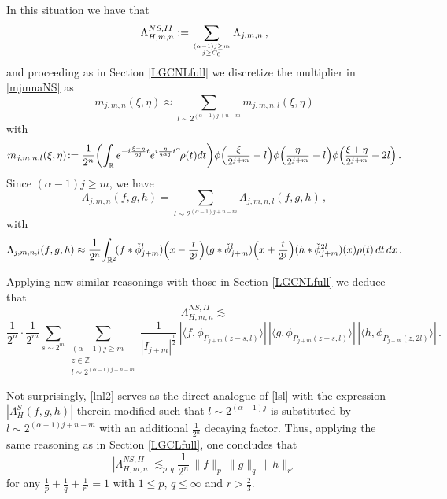 \documentclass[a4paper,reqno]{amsart}
\numberwithin{equation}{section}
\theoremstyle{definition}
\newcommand{\R}{\mathbb{R}}
\newcommand{\Z}{\mathbb{Z}}
\newcommand{\sdfrac}[2]{\mbox{\small$\displaystyle\frac{#1}{#2}$}}
\def\a{\alpha}
\def\L{\Lambda}
\begin{document}
In this situation we have that
\begin{align}\label{ns10NSL}
\L^{NS,II}_{H,m,n}:=\sum_{{(\a-1)j\geq m}\atop{j\geq C_0}} \L_{j,m,n}\,,
\end{align}
and proceeding as in Section \ref{LGCNLfull} we discretize the multiplier in \eqref{mjmnaNS} as
\begin{equation}\label{saljmm0nl1NSL}
		m_{j,m,n}(\xi,\eta)\approx\sum_{l\sim 2^{(\a-1)j+n-m}} m_{j,m,n,l}(\xi,\eta)
\end{equation}
with
\begin{equation}\label{saljmm1nlNSL}
		m_{j,m,n,l}(\xi,\eta)\!:=\frac{1}{2^n}\!\left(\int_\R e^{-i\frac{\xi-\eta}{2^j}  t}e^{i\frac{\eta}{2^{\a j}}t^\a}\!\rho(t)dt\right)\!
		\phi\Big(\sdfrac{\xi}{2^{j+m}}-l\Big)\phi\Big(\sdfrac{\eta}{2^{j+m}}-l\Big)\phi\Big(\sdfrac{\xi+\eta}{2^{j+m}}-2l\Big)\,.
\end{equation}
Since $(\a-1)j\geq m$, we have
\begin{equation}\label{saljmsumnlNSL}
\L_{j,m,n}(f,g,h)=\sum_{l\sim 2^{(\a-1)j+n-m}}\L_{j,m,n,l}(f,g,h)\,,
\end{equation}
with
\begin{equation}\label{saljm2nlNSL}
\L_{j,m,n,l}(f,g,h)\approx\frac{1}{2^n}\!\int_{\R^2} \! (f*\check{\phi}_{j+m}^l)\Big(x-\sdfrac{t}{2^j}\Big)(g*\check{\phi}_{j+m}^l)\Big(x+\sdfrac{t}{2^j}\Big)(h*\check{\phi}_{j+m}^{2l})(x)\rho(t)\,dt\,dx\,.
\end{equation}

Applying now similar reasonings with those in Section \ref{LGCNLfull} we deduce that
\begin{equation}\label{lnl2}
	\L^{NS,II}_{H,m,n}\lesssim
\end{equation}
$$\frac{1}{2^n} \cdot\frac{1}{2^m} \sum_{s\sim 2^m}\sum_{\substack{(\a-1)j\geq m\\[.1ex] z\in\Z\\[.1ex] l\sim 2^{(\a-1)j+n-m}}} \frac{1}{|I_{j+m}|^{\frac{1}{2}}}\, |\langle f,  \phi_{P_{j+m}(z-s,l)}\rangle|\,
|\langle g,  \phi_{P_{j+m}(z+s,l)}\rangle|\,|\langle h,  \phi_{P_{j+m}(z,2l)}\rangle|\,.$$

Not surprisingly, \eqref{lnl2} serves as the direct analogue of \eqref{lsl} with the expression $|\L^{S}_{H}(f,g,h)|$ therein modified such that $l\sim 2^{(\a-1)j}$ is substituted by $l\sim 2^{(\a-1)j+n-m}$ with an additional $\frac{1}{2^n}$ decaying factor. Thus, applying the same reasoning as in Section \ref{LGCLfull}, one concludes that
\begin{equation}\label{flrangenll1}
|\L^{NS,II}_{H,m,n}|\lesssim_{p,q} \frac{1}{2^n}\,\|f\|_p\,\|g\|_q\,\|h\|_{r'}
\end{equation}
for any $\frac{1}{p}+\frac{1}{q}+\frac{1}{r'}=1$ with $1\leq p,\,q\leq \infty$ and $r>\frac{2}{3}$.
\end{document}
